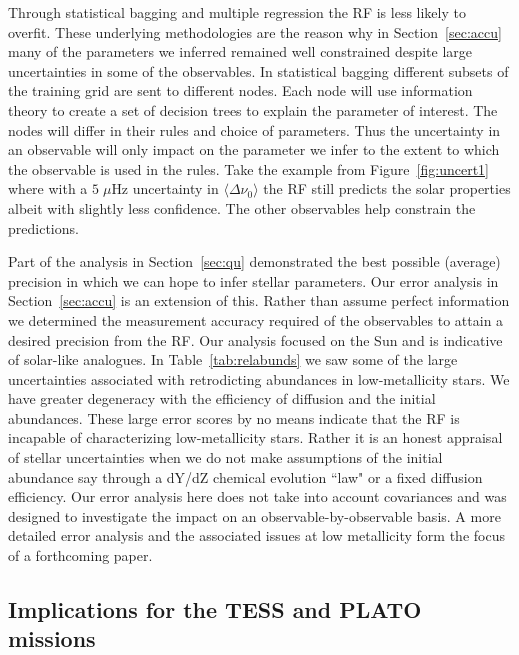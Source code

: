 Through statistical bagging and multiple regression the RF is less likely to overfit. %
These underlying methodologies are the reason why in Section~\ref{sec:accu} many of the parameters we inferred remained well constrained despite large uncertainties in some of the observables.   
In statistical bagging different subsets of the training grid are sent to different nodes. Each node will use information theory to create a set of decision trees to explain the parameter of interest. The nodes will differ in their rules and choice of parameters. Thus the uncertainty in an observable will only impact on the parameter we infer to the extent to which the observable is used in the rules.  
Take the example from Figure~\ref{fig:uncert1} where with a ${5\;\mu}$Hz uncertainty in ${\langle\Delta\nu_0\rangle}$ the RF still predicts the solar properties albeit with slightly less confidence.
The other observables help constrain the predictions. 

Part of the analysis in Section~\ref{sec:qu} demonstrated the best possible (average) precision in which we can hope to infer stellar parameters. Our error analysis in Section~\ref{sec:accu} is an extension of this. Rather than assume perfect information we determined  
 the measurement accuracy required of the observables to attain a desired precision from the RF.
Our analysis focused on the Sun and is indicative of solar-like analogues.
In Table~\ref{tab:relabunds} we saw some of the large uncertainties associated with retrodicting abundances in low-metallicity stars. We have greater degeneracy with the efficiency of diffusion and the initial abundances. These large error scores by no means indicate that the RF is incapable of characterizing low-metallicity stars. Rather it is an honest appraisal of stellar uncertainties when we do not make assumptions of the initial abundance say through a dY/dZ  chemical evolution ``law"  or a fixed diffusion efficiency. Our error analysis here does not take into account covariances and was designed to investigate the impact on an observable-by-observable basis.
A more detailed error analysis and the associated issues at low metallicity form the focus of a forthcoming paper.  


\subsection{Implications for the TESS and PLATO missions}

